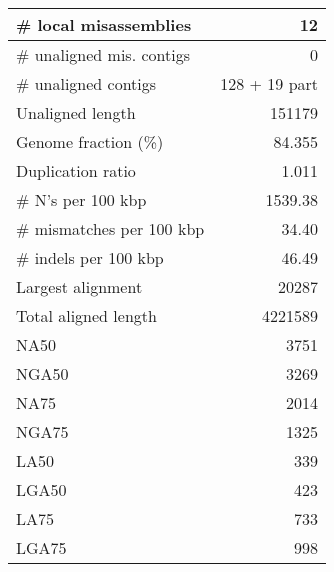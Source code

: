 \documentclass[12pt,a4paper]{article}
\begin{document}
\begin{table}[ht]
\begin{center}
\begin{tabular}{|l*{1}{|r}|}
\# local misassemblies & 12 \\ \hline
\# unaligned mis. contigs & 0 \\ \hline
\# unaligned contigs & 128 + 19 part \\ \hline
Unaligned length & 151179 \\ \hline
Genome fraction (\%) & 84.355 \\ \hline
Duplication ratio & 1.011 \\ \hline
\# N's per 100 kbp & 1539.38 \\ \hline
\# mismatches per 100 kbp & 34.40 \\ \hline
\# indels per 100 kbp & 46.49 \\ \hline
Largest alignment & 20287 \\ \hline
Total aligned length & 4221589 \\ \hline
NA50 & 3751 \\ \hline
NGA50 & 3269 \\ \hline
NA75 & 2014 \\ \hline
NGA75 & 1325 \\ \hline
LA50 & 339 \\ \hline
LGA50 & 423 \\ \hline
LA75 & 733 \\ \hline
LGA75 & 998 \\ \hline
\end{tabular}
\end{center}
\end{table}
\end{document}
